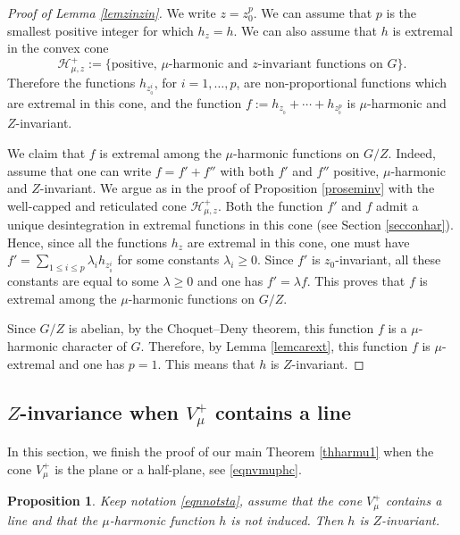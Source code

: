 \documentclass[JEP,XML,SOM,Unicode]{cedram}
\let\mathcal\mathscr
\newtheorem{Prop}[Thm]{Proposition}
\theoremstyle{definition}
\newcommand{\mc}[1]{\mathcal{ #1}}
\let\la\lambda
\let\bq\relax
\let\eq\relax
\begin{document}
\begin{proof}[Proof of Lemma \ref{lemzinzin}]
We write $z=z_0^p$. We can assume that $p$
is the smallest positive integer for which $h_z=h$.
We can also assume that $h$ is extremal in the
convex cone
\[
\mc H_{\mu,z}^+:=\{
\text{positive, $\mu$-harmonic and $z$-invariant functions on $G$}\}.
\]
Therefore the functions $h_{z_{_0}^i}$, for $i=1,\ldots, p$,
are non-proportional functions which are extremal
in this cone,
and the function $f:= h_{z_{_0}} +\cdots + h_{z_{_0}^{p}}$ is
$\mu$-harmonic and $Z$-invariant.

We claim that $f$ is extremal
among the $\mu$-harmonic functions on $G/Z$.
Indeed, assume that one can write $f=f'+f''$ with both $f'$ and $f''$
positive, $\mu$-harmonic and $Z$-invariant.
We argue as in the proof of Proposition \ref{proseminv}
with the well-capped and reticulated cone $\mc H_{\mu,z}^+$.
Both the function $f'$ and $f$
admit a unique desintegration in extremal functions in this cone
(see Section \ref{secconhar}).
Hence, since all the functions $h_z$ are extremal in this cone,
one must have $f'=\sum_{1\leq i\leq p} \la_i h_{z_{_0}^i}$
for some constants $\la_i\geq 0$. Since $f'$ is $z_0$-invariant,
all these constants are equal to some $\la\geq 0$ and one has $f'=\la f$.
This proves that $f$ is extremal
among the $\mu$-harmonic functions on $G/Z$.

Since $G/Z$ is abelian, by the Choquet--Deny theorem, this function $f$
is a $\mu$\nobreakdash-har\-monic character of $G$.
Therefore, by Lemma \ref{lemcarext}, this function $f$ is $\mu$-extremal
and one has $p=1$. This means that $h$ is $Z$-invariant.
\end{proof}

\subsection{$Z$-invariance when $V^+_\mu$ contains a line}
\label{secvmulin}

\bq
In this section, we finish the proof of our main Theorem
\ref{thharmu1}
when the cone $V_\mu^+$ is the plane or a half-plane,
see \eqref{eqnvmuphc}.
\eq

\begin{Prop}

\label{provmulin1}
Keep notation \eqref{eqnnotsta}, assume that
the cone $V^+_\mu$ contains a line and
that the $\mu$-harmonic function $h$ is not induced. Then
$h$ is $Z$-invariant.
\end{Prop}
\end{document}
